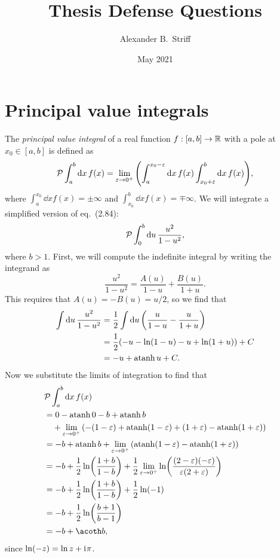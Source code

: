 \documentclass[12pt]{article}
\title{Thesis Defense Questions}
\author{Alexander B{.}~Striff}
\date{May 2021}
\begin{document}
\thispagestyle{empty}
\maketitle

\section{Principal value integrals}

The \emph{principal value integral} of a real function $f:[a, b] \to \mathbb{R}$ with a
pole at $x_0 \in [a, b]$ is defined as
\begin{equation}
  \pv\int_a^b \dd{x} f(x)
  = \lim_{\varepsilon \to 0^+} \qty(%
  \int_a^{x_0 - \varepsilon} \dd{x} f(x)
  \int_{x_0 + \varepsilon}^b \dd{x} f(x)
  ),
  \label{eq:pv}
\end{equation}
where $\int_a^{x_0} \dd{x} f(x) = \pm\infty$ and $\int_{x_0}^b \dd{x} f(x) =
\mp\infty$. We will integrate a simplified version of eq.~(2.84):
\begin{equation}
  \pv\int_0^b \dd{u} \frac{u^2}{1 - u^2},
\end{equation}
where $b > 1$. First, we will compute the indefinite integral by writing the
integrand as
\begin{equation}
  \frac{u^2}{1 - u^2}
  = \frac{A(u)}{1 - u} + \frac{B(u)}{1 + u}.
\end{equation}
This requires that $A(u) = -B(u) = u/2$, so we find that
\begin{align}
  \int\dd{u}\frac{u^2}{1 - u^2}
  &= \frac{1}{2}\int\dd{u}\qty(\frac{u}{1 - u} - \frac{u}{1 + u}) \\
  &= \frac{1}{2}\qty(-u - \ln(1 - u) - u + \ln(1 + u)) + C \\
  &= -u + \operatorname{\mathrm{atanh}} u + C.
\end{align}
Now we substitute the limits of integration to find that
\begin{align}
  &\pv\int_a^b \dd{x} f(x) \\
  &=
  0 - \atanh 0
  -b + \atanh b \\
  &\quad+ \lim_{\varepsilon \to 0^+} \qty(%
  -(1 - \varepsilon) + \atanh(1 - \varepsilon)
  + (1 + \varepsilon) - \atanh(1 + \varepsilon)
  ) \\
  &=
  -b + \atanh b
  + \lim_{\varepsilon \to 0^+} \qty(%
  \atanh(1 - \varepsilon)
  - \atanh(1 + \varepsilon)
  ) \\
  &=
  -b + \frac{1}{2}\ln(\frac{1 + b}{1 - b})
  + \frac{1}{2} \lim_{\varepsilon \to 0^+}
  \ln(\frac{(2-\varepsilon)(-\varepsilon)}{\varepsilon(2+\varepsilon)})
  \\
  &=
  -b + \frac{1}{2}\ln(\frac{1 + b}{1 - b})
  + \frac{1}{2} \ln(-1)
  \\
  &=
  -b + \frac{1}{2}\ln(\frac{b + 1}{b - 1})
  \\
  &= -b + \acoth b,
\end{align}
since $\ln(-z) = \ln z + \mathrm{i}\mkern1mu\pi$.
\end{document}
